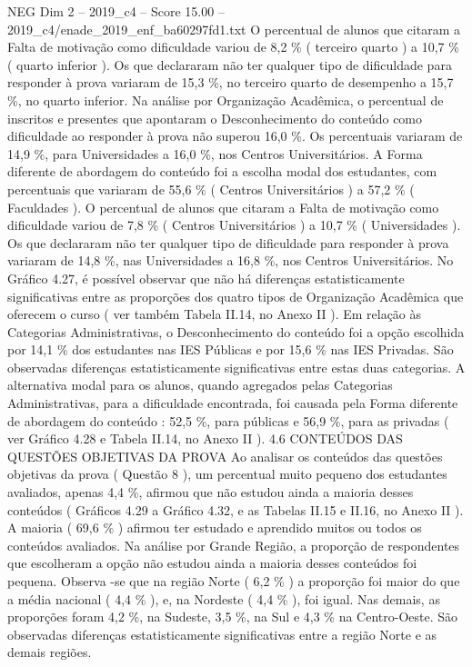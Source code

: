 \begin{textsample}{NEG Dim 2 – 2019\_c4 – Score 15.00 – 2019\_c4/enade\_2019\_enf\_ba60297fd1.txt}
O percentual de alunos que citaram a Falta de motivação como dificuldade variou de 8,2 \% ( terceiro quarto ) a 10,7 \% ( quarto inferior ).
Os que declararam não ter qualquer tipo de dificuldade para responder à prova variaram de 15,3 \%, no terceiro quarto de desempenho a 15,7 \%, no quarto inferior.
Na análise por Organização Acadêmica, o percentual de inscritos e presentes que apontaram o Desconhecimento do conteúdo como dificuldade ao responder à prova não superou 16,0 \%.
Os percentuais variaram de 14,9 \%, para Universidades a 16,0 \%, nos Centros Universitários.
A Forma diferente de abordagem do conteúdo foi a escolha modal dos estudantes, com percentuais que variaram de 55,6 \% ( Centros Universitários ) a 57,2 \% ( Faculdades ).
O percentual de alunos que citaram a Falta de motivação como dificuldade variou de 7,8 \% ( Centros Universitários ) a 10,7 \% ( Universidades ).
Os que declararam não ter qualquer tipo de dificuldade para responder à prova variaram de 14,8 \%, nas Universidades a 16,8 \%, nos Centros Universitários.
No Gráfico 4.27, é possível observar que não há diferenças estatisticamente significativas entre as proporções dos quatro tipos de Organização Acadêmica que oferecem o curso ( ver também Tabela II.14, no Anexo II ).
Em relação às Categorias Administrativas, o Desconhecimento do conteúdo foi a opção escolhida por 14,1 \% dos estudantes nas IES Públicas e por 15,6 \% nas IES Privadas.
São observadas diferenças estatisticamente significativas entre estas duas categorias.
A alternativa modal para os alunos, quando agregados pelas Categorias Administrativas, para a dificuldade encontrada, foi causada pela Forma diferente de abordagem do conteúdo : 52,5 \%, para públicas e 56,9 \%, para as privadas ( ver Gráfico 4.28 e Tabela II.14, no Anexo II ). 4.6 CONTEÚDOS DAS QUESTÕES OBJETIVAS DA PROVA Ao analisar os conteúdos das questões objetivas da prova ( Questão 8 ), um percentual muito pequeno dos estudantes avaliados, apenas 4,4 \%, afirmou que não estudou ainda a maioria desses conteúdos ( Gráficos 4.29 a Gráfico 4.32, e as Tabelas II.15 e II.16, no Anexo II ).
A maioria ( 69,6 \% ) afirmou ter estudado e aprendido muitos ou todos os conteúdos avaliados.
Na análise por Grande Região, a proporção de respondentes que escolheram a opção não estudou ainda a maioria desses conteúdos foi pequena.
Observa -se que na região Norte ( 6,2 \% ) a proporção foi maior do que a média nacional ( 4,4 \% ), e, na Nordeste ( 4,4 \% ), foi igual.
Nas demais, as proporções foram 4,2 \%, na Sudeste, 3,5 \%, na Sul e 4,3 \% na Centro-Oeste.
São observadas diferenças estatisticamente significativas entre a região Norte e as demais regiões.

\end{textsample}
